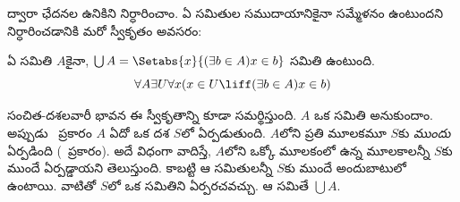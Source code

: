\documentclass[../../../include/open-logic-section]{subfiles}
\begin{document}

ద్వారా ఛేదనల ఉనికిని నిర్ధారించాం. ఏ సమితుల సముదాయానికైనా
సమ్మేళనం ఉంటుందని నిర్ధారించడానికి మరో స్వీకృతం అవసరం:

\begin{axiom}[సమ్మేళనం] ఏ సమితి $A$కైనా,
$\bigcup A =
\Setabs{x}{(\exists b \in A) x \in b}$ సమితి ఉంటుంది.
\[
	\forall A \exists U \forall x(x \in U \liff (\exists b \in A)x \in b)
\]
\end{axiom}

సంచిత-దశలవారీ భావన
ఈ స్వీకృతాన్ని కూడా
సమర్థిస్తుంది. $A$ ఒక
సమితి అనుకుందాం. అప్పుడు
\stageshier\ ప్రకారం $A$
ఏదో ఒక దశ $S$లో
ఏర్పడుతుంది. $A$లోని
ప్రతి మూలకమూ $S$కు
\emph{ముందు} ఏర్పడింది
(\stagesacc\ ప్రకారం).
అదే విధంగా వాదిస్తే, $A$లోని ఒక్కో మూలకంలో
ఉన్న మూలకాలన్నీ $S$కు ముందే ఏర్పడ్డాయని తెలుస్తుంది.
కాబట్టి ఆ సమితులన్నీ $S$కు ముందే అందుబాటులో ఉంటాయి.
వాటితో $S$లో ఒక సమితిని ఏర్పరచవచ్చు. ఆ సమితే
$\bigcup A$.
\end{document}
